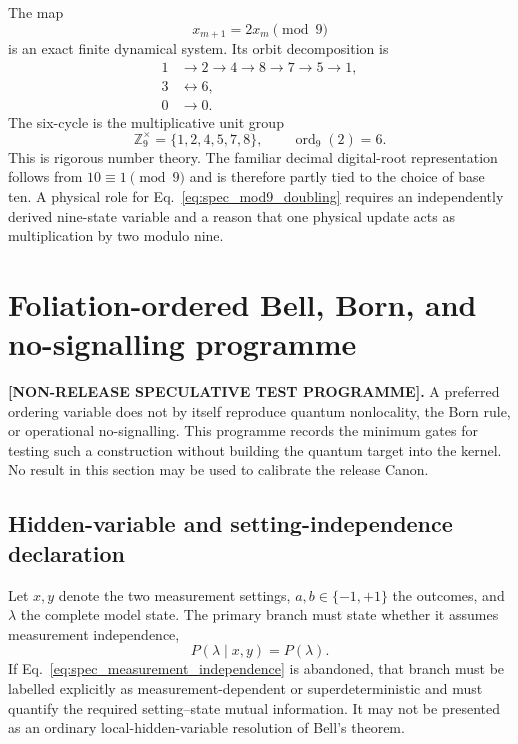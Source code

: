 \documentclass[11pt]{article}
\newcommand{\Z}{\mathbb Z}
\begin{document}
The map
\begin{equation}
    x_{m+1}=2x_m\pmod 9
    \label{eq:spec_mod9_doubling}
\end{equation}
is an exact finite dynamical system.  Its orbit decomposition is
\begin{align}
    1&\rightarrow2\rightarrow4\rightarrow8\rightarrow7\rightarrow5\rightarrow1,
    \\
    3&\leftrightarrow6,
    \\
    0&\rightarrow0.
\end{align}
The six-cycle is the multiplicative unit group
\begin{equation}
    \Z_9^{\times}=\{1,2,4,5,7,8\},
    \qquad
    \operatorname{ord}_9(2)=6.
\end{equation}
This is rigorous number theory.  The familiar decimal digital-root
representation follows from $10\equiv1\pmod9$ and is therefore partly tied to
the choice of base ten.  A physical role for Eq.~\eqref{eq:spec_mod9_doubling}
requires an independently derived nine-state variable and a reason that one
physical update acts as multiplication by two modulo nine.

\section{Foliation-ordered Bell, Born, and no-signalling programme}
\label{sec:spec_bell_born_programme}

\textbf{[NON-RELEASE SPECULATIVE TEST PROGRAMME].}
A preferred ordering variable does not by itself reproduce quantum
nonlocality, the Born rule, or operational no-signalling.  This programme
records the minimum gates for testing such a construction without building the
quantum target into the kernel.  No result in this section may be used to
calibrate the release Canon.

\subsection*{Hidden-variable and setting-independence declaration}

Let \(x,y\) denote the two measurement settings, \(a,b\in\{-1,+1\}\) the
outcomes, and \(\lambda\) the complete model state.  The primary branch must
state whether it assumes measurement independence,
\begin{equation}
    P(\lambda\mid x,y)=P(\lambda).
    \label{eq:spec_measurement_independence}
\end{equation}
If Eq.~\eqref{eq:spec_measurement_independence} is abandoned, that branch must
be labelled explicitly as measurement-dependent or superdeterministic and must
quantify the required setting--state mutual information.  It may not be
presented as an ordinary local-hidden-variable resolution of Bell's theorem.
\end{document}
